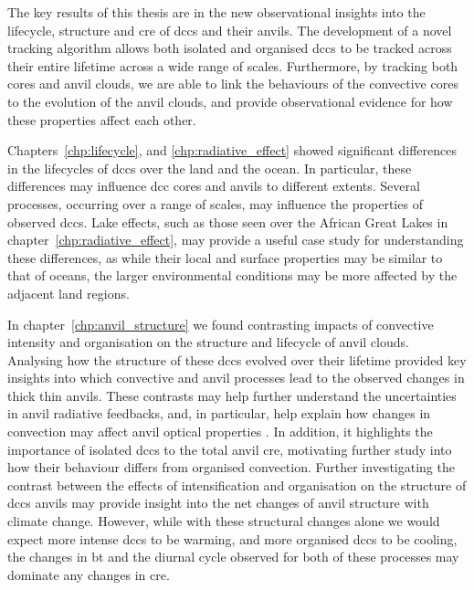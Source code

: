 The key results of this thesis are in the new observational insights into the lifecycle, structure and \acrshort{cre} of \acrshort{dcc}s and their anvils.
The development of a novel tracking algorithm allows both isolated and organised \acrshort{dcc}s to be tracked across their entire lifetime across a wide range of scales.
Furthermore, by tracking both cores and anvil clouds, we are able to link the behaviours of the convective cores to the evolution of the anvil clouds, and provide observational evidence for how these properties affect each other.

Chapters~\ref{chp:lifecycle}, and \ref{chp:radiative_effect} showed significant differences in the lifecycles of \acrshort{dcc}s over the land and the ocean.
In particular, these differences may influence \acrshort{dcc} cores and anvils to different extents.
Several processes, occurring over a range of scales, may influence the properties of observed \acrshort{dcc}s.
Lake effects, such as those seen over the African Great Lakes in chapter~\ref{chp:radiative_effect}, may provide a useful case study for understanding these differences, as while their local and surface properties may be similar to that of oceans, the larger environmental conditions may be more affected by the adjacent land regions.

In chapter~\ref{chp:anvil_structure} we found contrasting impacts of convective intensity and organisation on the structure and lifecycle of anvil clouds. 
Analysing how the structure of these \acrshort{dcc}s evolved over their lifetime provided key insights into which convective and anvil processes lead to the observed changes in thick thin anvils.
These contrasts may help further understand the uncertainties in anvil radiative feedbacks, and, in particular, help explain how changes in convection may affect anvil optical properties \citep{mckim_weak_2024}.
In addition, it highlights the importance of isolated \acrshort{dcc}s to the total anvil \acrshort{cre}, motivating further study into how their behaviour differs from organised convection.
Further investigating the contrast between the effects of intensification and organisation on the structure of \acrshort{dcc}s anvils may provide insight into the net changes of anvil structure with climate change. However, while with these structural changes alone we would expect more intense \acrshort{dcc}s to be warming, and more organised \acrshort{dcc}s to be cooling, the changes in \acrshort{bt} and the diurnal cycle observed for both of these processes may dominate any changes in \acrshort{cre}.

